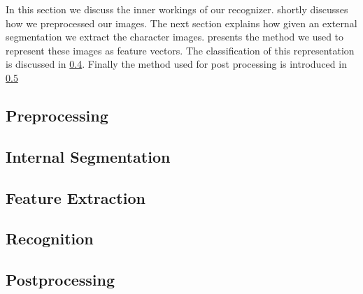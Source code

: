 In this section we discuss the inner workings of our recognizer.  shortly discusses how we preprocessed our images. The next section explains how given an external segmentation we extract the character images.  presents the method we used to represent these images as feature vectors. The classification of this representation is discussed in \cref{ss:methods:recognition}. Finally the method used for post processing is introduced in \cref{ss:methods:postprocessing}

\subsection{Preprocessing}
\label{ss:methods:preprocessing}


\subsection{Internal Segmentation}
\label{ss:methods:characterSegmentation}


\subsection{Feature Extraction}
\label{ss:methods:featureExtraction}


\subsection{Recognition}
\label{ss:methods:recognition}


\subsection{Postprocessing}
\label{ss:methods:postprocessing}


